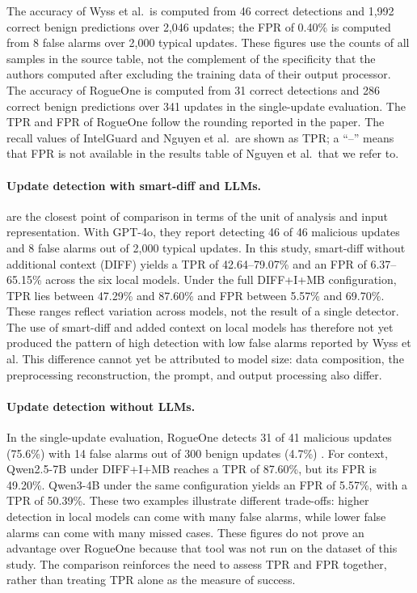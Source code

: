 \documentclass[a4paper,fleqn]{cas-dc}
\begin{document}
The accuracy of Wyss et al.\ is computed from 46 correct detections and 1,992
correct benign predictions over 2,046 updates; the FPR of 0.40\% is computed from
8 false alarms over 2,000 typical updates. These figures use the counts of all
samples in the source table, not the complement of the specificity that the
authors computed after excluding the training data of their output processor.
The accuracy of RogueOne is computed from 31 correct detections and 286 correct
benign predictions over 341 updates in the single-update evaluation. The TPR and
FPR of RogueOne follow the rounding reported in the paper. The recall values of
IntelGuard and Nguyen et al.\ are shown as TPR; a ``--'' means that FPR is not
available in the results table of Nguyen et al.\ that we refer to.

\paragraph{Update detection with smart-diff and LLMs.}
\citet{wyss2025evaluating} are the closest point of comparison in terms of the
unit of analysis and input representation. With GPT-4o, they report detecting 46
of 46 malicious updates and 8 false alarms out of 2,000 typical updates. In this
study, smart-diff without additional context (DIFF) yields a TPR of
42.64--79.07\% and an FPR of 6.37--65.15\% across the six local models. Under the
full DIFF+I+MB configuration, TPR lies between 47.29\% and 87.60\% and FPR between
5.57\% and 69.70\%. These ranges reflect variation across models, not the result
of a single detector. The use of smart-diff and added context on local models has
therefore not yet produced the pattern of high detection with low false alarms
reported by Wyss et al. This difference cannot yet be attributed to model size:
data composition, the preprocessing reconstruction, the prompt, and output
processing also differ.

\paragraph{Update detection without LLMs.}
In the single-update evaluation, RogueOne detects 31 of 41 malicious updates
(75.6\%) with 14 false alarms out of 300 benign updates (4.7\%)
\citep{sofaer2024rogueone}. For context, Qwen2.5-7B under DIFF+I+MB reaches a TPR
of 87.60\%, but its FPR is 49.20\%. Qwen3-4B under the same configuration yields
an FPR of 5.57\%, with a TPR of 50.39\%. These two examples illustrate different
trade-offs: higher detection in local models can come with many false alarms,
while lower false alarms can come with many missed cases. These figures do not
prove an advantage over RogueOne because that tool was not run on the dataset of
this study. The comparison reinforces the need to assess TPR and FPR together,
rather than treating TPR alone as the measure of success.
\end{document}
